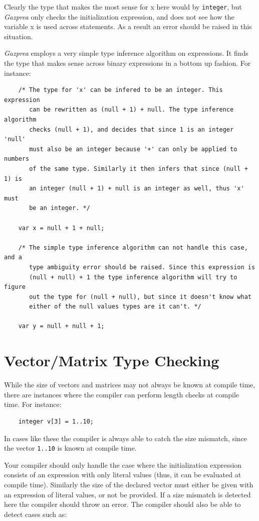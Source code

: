 \documentclass{article}
\begin{document}
  Clearly the type that makes the most sense for x here would by \texttt{integer}, but \textit{Gazprea} only checks the
  initialization expression, and does not see how the variable x is used across statements. As a result an error
  should be raised in this situation.

  \textit{Gazprea} employs a very simple type inference algorithm on expressions.  It finds the type that makes sense
  across binary expressions in a bottom up fashion. For instance:

  \begin{lstlisting}
    /* The type for 'x' can be infered to be an integer. This expression
       can be rewritten as (null + 1) + null. The type inference algorithm
       checks (null + 1), and decides that since 1 is an integer 'null'
       must also be an integer because '+' can only be applied to numbers
       of the same type. Similarly it then infers that since (null + 1) is
       an integer (null + 1) + null is an integer as well, thus 'x' must
       be an integer. */

    var x = null + 1 + null;

    /* The simple type inference algorithm can not handle this case, and a
       type ambiguity error should be raised. Since this expression is
       (null + null) + 1 the type inference algorithm will try to figure
       out the type for (null + null), but since it doesn't know what
       either of the null values types are it can't. */

    var y = null + null + 1;
  \end{lstlisting}


\section{Vector/Matrix Type Checking}\label{sec:typeChecking}


  While the size of vectors and matrices may not always be known at compile time, there are instances where the
  compiler can perform length checks at compile time. For instance:

  \begin{lstlisting}
    integer v[3] = 1..10;
  \end{lstlisting}

  In cases like these the compiler is always able to catch the size mismatch, since the vector \texttt{1..10} is known
  at compile time.

  Your compiler should only handle the case where the initialization expression consists of an expression with only
  literal values (thus, it can be evaluated at compile time). Similarly the size of the declared vector must either be
  given with an expression of literal values, or not be provided. If a size mismatch is detected here the compiler
  should throw an error. The compiler should also be able to detect cases such as:
\end{document}

